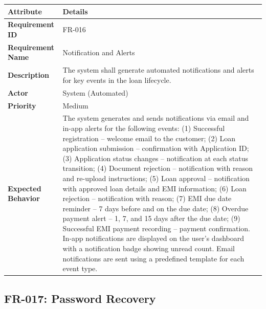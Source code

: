 \documentclass[12pt,a4paper,oneside]{report}
\begin{document}
\begin{table}[htbp]
\centering
\small
\begin{tabularx}{\textwidth}{l l}
\toprule
\textbf{Attribute} & \textbf{Details} \\
\midrule
\textbf{Requirement ID} & FR-016 \\
\textbf{Requirement Name} & Notification and Alerts \\
\textbf{Description} & The system shall generate automated notifications and alerts for key events in the loan lifecycle. \\
\textbf{Actor} & System (Automated) \\
\textbf{Priority} & Medium \\
\textbf{Expected Behavior} & The system generates and sends notifications via email and in-app alerts for the following events: (1) Successful registration – welcome email to the customer; (2) Loan application submission – confirmation with Application ID; (3) Application status changes – notification at each status transition; (4) Document rejection – notification with reason and re-upload instructions; (5) Loan approval – notification with approved loan details and EMI information; (6) Loan rejection – notification with reason; (7) EMI due date reminder – 7 days before and on the due date; (8) Overdue payment alert – 1, 7, and 15 days after the due date; (9) Successful EMI payment recording – payment confirmation. In-app notifications are displayed on the user's dashboard with a notification badge showing unread count. Email notifications are sent using a predefined template for each event type. \\
\bottomrule
\end{tabularx}
\end{table}

\subsection{FR-017: Password Recovery}
\end{document}
